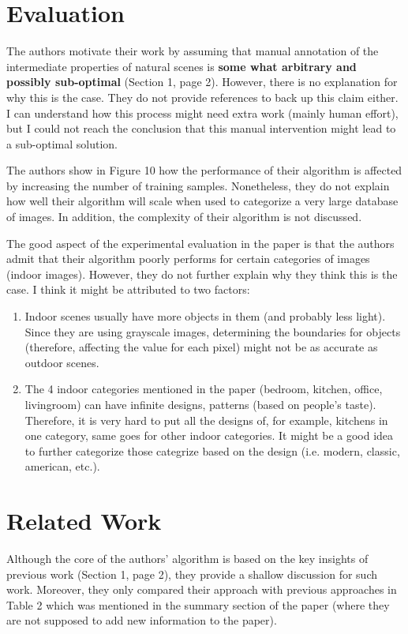 \documentclass[11pt,a4paper]{article}
\begin{document}
\section{Evaluation}
The authors motivate their work by assuming that manual annotation of the intermediate properties of natural scenes is \textbf{some what arbitrary and
possibly sub-optimal} (Section 1, page 2). However, there is no explanation for why this is the case. They do not provide references to back up this claim
either. I can understand how this process might need extra work (mainly human effort), but I could not reach the conclusion that this manual intervention might
lead to a sub-optimal solution.

The authors show in Figure 10 how the performance of their algorithm is affected by increasing the number of training samples. Nonetheless, they do not explain
how well their algorithm will scale when used to categorize a very large database of images. In addition, the complexity of their algorithm is not discussed.

The good aspect of the experimental evaluation in the paper is that the authors admit that their algorithm poorly performs for certain categories of images
(indoor images). However, they do not further explain why they think this is the case. I think it might be attributed to two factors:

\begin{enumerate}
 \item Indoor scenes usually have more objects in them (and probably less light). Since they are using grayscale images, determining the boundaries for
objects (therefore, affecting the value for each pixel) might not be as accurate as outdoor scenes.
 \item The 4 indoor categories mentioned in the paper (bedroom, kitchen, office, livingroom) can have infinite designs, patterns (based on people's taste).
Therefore, it is very hard to put all the designs of, for example, kitchens in one category, same goes for other indoor categories. It might be a good idea to
further categorize those categrize based on the design (i.e. modern, classic, american, etc.).
\end{enumerate}

\section{Related Work}
Although the core of the authors' algorithm is based on the key insights of previous work (Section 1, page 2), they provide a shallow discussion for such work.
Moreover, they only compared their approach with previous approaches in Table 2 which was mentioned in the summary section of the paper (where they are not
supposed to add new information to the paper).
\end{document}
